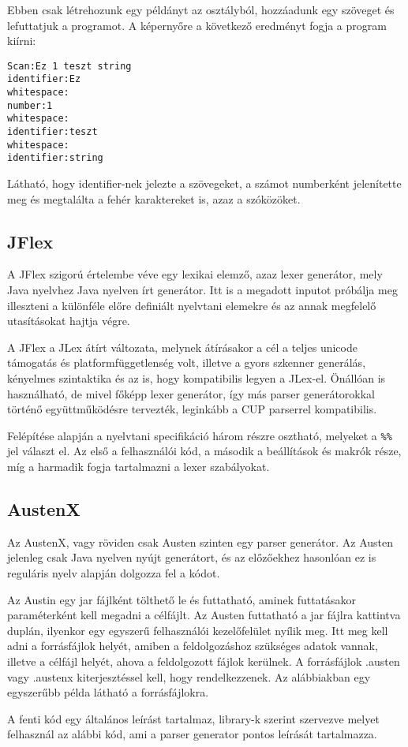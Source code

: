 Ebben csak létrehozunk egy példányt az osztályból, hozzáadunk egy szöveget és lefuttatjuk a programot. A képernyőre a következő eredményt fogja a program kiírni:

\begin{verbatim}
Scan:Ez 1 teszt string
identifier:Ez
whitespace: 
number:1
whitespace: 
identifier:teszt
whitespace: 
identifier:string
\end{verbatim}

Látható, hogy identifier-nek jelezte a szövegeket, a számot numberként jelenítette meg és megtalálta a fehér karaktereket is, azaz a szóközöket.

\subsection{JFlex}

A JFlex szigorú értelembe véve egy lexikai elemző, azaz lexer generátor, mely Java nyelvhez Java nyelven írt generátor. Itt is a megadott inputot próbálja meg illeszteni a különféle előre definiált nyelvtani elemekre és az annak megfelelő utasításokat hajtja végre.

A JFlex a JLex átírt változata, melynek átírásakor a cél a teljes unicode támogatás és platformfüggetlenség volt, illetve a gyors szkenner generálás, kényelmes szintaktika és az is, hogy kompatibilis legyen a JLex-el. Önállóan is használható, de mivel főképp lexer generátor, így más parser generátorokkal történő együttműködésre tervezték, leginkább a CUP parserrel kompatibilis.

Felépítése alapján a nyelvtani specifikáció három részre osztható, melyeket a \texttt{\%\%} jel választ el. Az első a felhasználói kód, a második a beállítások és makrók része, míg a harmadik fogja tartalmazni a lexer szabályokat.


\subsection{AustenX}

Az AustenX, vagy röviden csak Austen szinten egy parser generátor. Az Austen jelenleg csak Java nyelven nyújt generátort, és az előzőekhez hasonlóan ez is reguláris nyelv alapján dolgozza fel a kódot.

Az Austin egy jar fájlként tölthető le és futtatható, aminek futtatásakor paraméterként kell megadni a célfájlt. Az Austen futtatható a jar fájlra kattintva duplán, ilyenkor egy egyszerű felhasználói kezelőfelület nyílik meg. Itt meg kell adni a forrásfájlok helyét, amiben a feldolgozáshoz szükséges adatok vannak, illetve a célfájl helyét, ahova a feldolgozott fájlok kerülnek. A forrásfájlok .austen vagy .austenx kiterjesztéssel kell, hogy rendelkezzenek. Az alábbiakban egy egyszerűbb példa látható a forrásfájlokra.


A fenti kód egy általános leírást tartalmaz, library-k szerint szervezve melyet felhasznál az alábbi kód, ami a parser generator pontos leírását tartalmazza.
